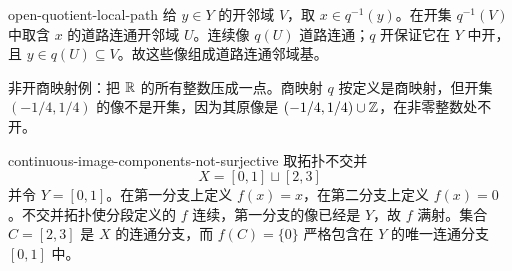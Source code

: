 \begin{solution}{open-quotient-local-path}
给 \(y\in Y\) 的开邻域 \(V\)，取 \(x\in q^{-1}(y)\)。在开集
\(q^{-1}(V)\) 中取含 \(x\) 的道路连通开邻域 \(U\)。连续像 \(q(U)\) 道路连通；\(q\) 开保证它在 \(Y\) 中开，且
\(y\in q(U)\subseteq V\)。故这些像组成道路连通邻域基。

非开商映射例：把 \(\mathbb{R}\) 的所有整数压成一点。商映射 \(q\) 按定义是商映射，但开集 \((-1/4,1/4)\) 的像不是开集，因为其原像是
\((-1/4,1/4)\cup\mathbb{Z}\)，在非零整数处不开。
\end{solution}

\begin{solution}{continuous-image-components-not-surjective}
取拓扑不交并
\[
 X=[0,1]\sqcup[2,3]
\]
并令 \(Y=[0,1]\)。在第一分支上定义 \(f(x)=x\)，在第二分支上定义
\(f(x)=0\)。不交并拓扑使分段定义的 \(f\) 连续，第一分支的像已经是
\(Y\)，故 \(f\) 满射。集合 \(C=[2,3]\) 是 \(X\) 的连通分支，而
\(f(C)=\{0\}\) 严格包含在 \(Y\) 的唯一连通分支 \([0,1]\) 中。
\end{solution}
